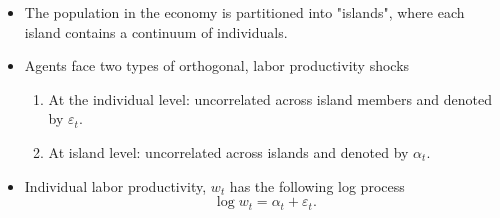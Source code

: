 \documentclass[notes=show]{beamer}
\begin{document}
\begin{frame}%



\begin{itemize}
\item The population in the economy is partitioned into "islands", where
each island contains a continuum of individuals.

\item Agents face two types of orthogonal, labor productivity shocks

\begin{enumerate}
\item At the individual level: uncorrelated across island members and
denoted by $\varepsilon _{t}$.

\item At island level: uncorrelated across islands and denoted by $\alpha
_{t}$.
\end{enumerate}

\item Individual labor productivity, $w_{t}$ has the following log process%
\begin{equation}
\log w_{t}=\alpha _{t}+\varepsilon _{t}.
\end{equation}
\end{itemize}

\transboxout%
\end{frame}%

\bigskip
\end{document}
